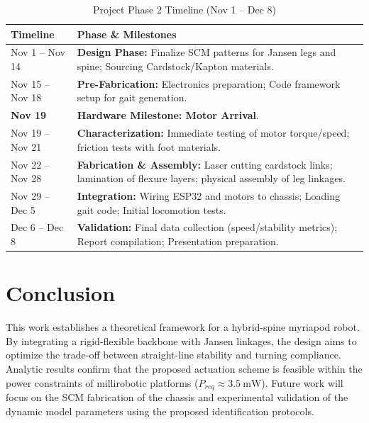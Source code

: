 \documentclass[11pt, letterpaper]{article}
\begin{document}
\begin{table}[H]
  \centering
  \caption{Project Phase 2 Timeline (Nov 1 -- Dec 8)}
  \label{tab:roadmap}
  \begin{tabular}{p{3.5cm}p{11.0cm}}
    \toprule
    \textbf{Timeline} & \textbf{Phase \& Milestones} \\
    \midrule
    Nov 1 -- Nov 14 & \textbf{Design Phase:} Finalize SCM patterns for Jansen legs and spine; Sourcing Cardstock/Kapton materials. \\
    \addlinespace
    Nov 15 -- Nov 18 & \textbf{Pre-Fabrication:} Electronics preparation; Code framework setup for gait generation. \\
    \addlinespace
    \textbf{Nov 19} & \textbf{Hardware Milestone: Motor Arrival}. \\
    \addlinespace
    Nov 19 -- Nov 21 & \textbf{Characterization:} Immediate testing of motor torque/speed; friction tests with foot materials. \\
    \addlinespace
    Nov 22 -- Nov 28 & \textbf{Fabrication \& Assembly:} Laser cutting cardstock links; lamination of flexure layers; physical assembly of leg linkages. \\
    \addlinespace
    Nov 29 -- Dec 5 & \textbf{Integration:} Wiring ESP32 and motors to chassis; Loading gait code; Initial locomotion tests. \\
    \addlinespace
    Dec 6 -- Dec 8 & \textbf{Validation:} Final data collection (speed/stability metrics); Report compilation; Presentation preparation. \\
    \bottomrule
  \end{tabular}
\end{table}

\section{Conclusion}

This work establishes a theoretical framework for a hybrid-spine myriapod robot. By integrating a rigid-flexible backbone with Jansen linkages, the design aims to optimize the trade-off between straight-line stability and turning compliance. Analytic results confirm that the proposed actuation scheme is feasible within the power constraints of millirobotic platforms ($P_{req} \approx \SI{3.5}{\milli\watt}$). Future work will focus on the SCM fabrication of the chassis and experimental validation of the dynamic model parameters using the proposed identification protocols.
\end{document}
